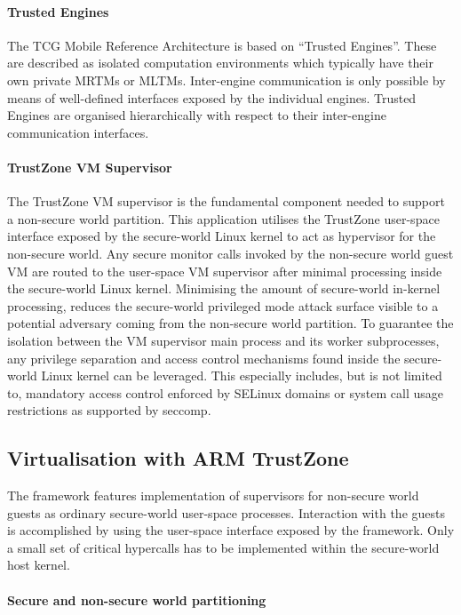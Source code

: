 \documentclass{article}
\begin{document}
\paragraph{Trusted Engines}

The TCG Mobile Reference Architecture is based on “Trusted Engines”. These are described as isolated computation environments which typically have their own private MRTMs or MLTMs. Inter-engine communication is only possible by means of well-defined interfaces exposed by the individual engines. Trusted Engines are organised hierarchically with respect to their inter-engine communication interfaces.

\paragraph{TrustZone VM Supervisor}

The TrustZone VM supervisor is the fundamental component needed to support a non-secure world partition. This application utilises the TrustZone user-space interface exposed by the secure-world Linux kernel to act as hypervisor for the non-secure world. Any secure monitor calls invoked by the non-secure world guest VM are routed to the user-space VM supervisor after minimal processing inside the secure-world Linux kernel. Minimising the amount of secure-world in-kernel processing, reduces the secure-world privileged mode attack surface visible to a potential adversary coming from the non-secure world partition. To guarantee the isolation between the VM supervisor main process and its worker subprocesses, any privilege separation and access control mechanisms found inside the secure-world Linux kernel can be leveraged. This especially includes, but is not limited to, mandatory access control enforced by SELinux domains or system call usage restrictions as supported by seccomp.

\subsection{Virtualisation with ARM TrustZone}

The framework features implementation of supervisors for non-secure world guests as ordinary secure-world user-space processes. Interaction with the guests is accomplished by using the user-space interface exposed by the framework. Only a small set of critical hypercalls has to be implemented within the secure-world host kernel.

\paragraph{Secure and non-secure world partitioning}
\end{document}
